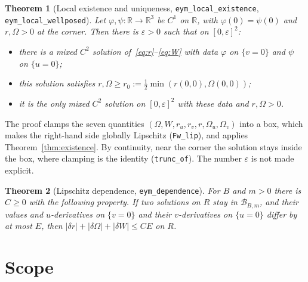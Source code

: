 \documentclass[11pt]{amsart}
\newtheorem{theorem}{Theorem}[section]
\theoremstyle{definition}
\theoremstyle{remark}
\newcommand{\lean}[1]{\texttt{#1}}
\newcommand{\R}{\mathbb{R}}
\begin{document}
\begin{theorem}[Local existence and uniqueness, \lean{eym\_local\_existence}, \lean{eym\_local\_wellposed}]\label{thm:lwp}
Let $\varphi,\psi:\R\to\R^3$ be $C^1$ on $\R$, with $\varphi(0)=\psi(0)$ and $r,\Omega>0$ at the corner. Then there is $\varepsilon>0$ such that on $[0,\varepsilon]^2$:
\begin{itemize}
\item there is a mixed $C^2$ solution of~\eqref{eq:r}--\eqref{eq:W} with data $\varphi$ on $\{v=0\}$ and $\psi$ on $\{u=0\}$;
\item this solution satisfies $r,\Omega\ge r_0:=\frac12\min(r(0,0),\Omega(0,0))$;
\item it is the only mixed $C^2$ solution on $[0,\varepsilon]^2$ with these data and $r,\Omega>0$.
\end{itemize}
\end{theorem}
The proof clamps the seven quantities $(\Omega,W,r_u,r_v,r,\Omega_u,\Omega_v)$ into a box, which makes the right-hand side globally Lipschitz (\lean{Fw\_lip}), and applies Theorem~\ref{thm:existence}. By continuity, near the corner the solution stays inside the box, where clamping is the identity (\lean{trunc\_of}). The number $\varepsilon$ is not made explicit.

\begin{theorem}[Lipschitz dependence, \lean{eym\_dependence}]
For $B$ and $m>0$ there is $C\ge0$ with the following property. If two solutions on $R$ stay in $\mathcal B_{B,m}$, and their values and $u$-derivatives on $\{v=0\}$ and their $v$-derivatives on $\{u=0\}$ differ by at most $E$, then $|\delta r|+|\delta\Omega|+|\delta W|\le CE$ on $R$.
\end{theorem}

\section{Scope}\label{sec:scope}
\end{document}
